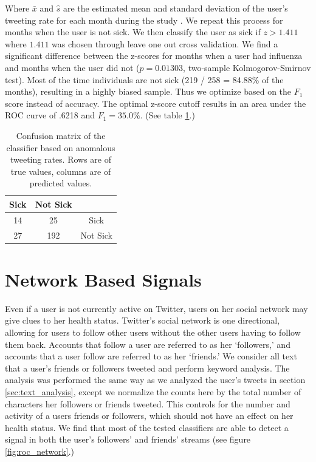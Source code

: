 \documentclass{acm_proc_article-sp}
\begin{document}
Where \(\bar{x}\) and \(\hat{s}\) are the estimated mean and standard deviation of the user's tweeting rate for each month during the study \cite{Grubs:1969ab}. We repeat this process for months when the user is not sick. We then classify the user as sick if \(z > 1.411\) where \(1.411\) was chosen through leave one out cross validation. We find a significant difference between the z-scores for months when a user had influenza and months when the user did not (\(p = 0.01303\), two-sample Kolmogorov-Smirnov test). Most of the time individuals are not sick (219 / 258 = 84.88\% of the months), resulting in a highly biased sample. Thus we optimize based on the \(F_1\) score instead of accuracy. The optimal z-score cutoff results in  an area under the ROC curve of .6218 and \(F_1= 35.0\%\). (See table \ref{tab:tweet_anomaly_confusion}.) 


\begin{table}[h]
\centering
\begin{tabular}{|c|c|c|} \hline
Sick&Not Sick&\ \\ \hline
14 & 25 & Sick\\ \hline
27 & 192 & Not Sick\\
\hline\end{tabular}
\caption{Confusion matrix of the classifier based on anomalous tweeting rates. Rows are of true values, columns are of predicted values.}
\label{tab:tweet_anomaly_confusion}
\end{table}

\section{Network Based Signals}

Even if a user is not currently active on Twitter, users on her social network may give clues to her health status. Twitter's social network is one directional, allowing for users to follow other users without the other users having to follow them back. Accounts that follow a user are referred to as her `followers,' and accounts that a user follow are referred to as her `friends.' We consider all text that a user's friends or followers tweeted and perform keyword analysis. The analysis was performed the same way as we analyzed the user's tweets in section \ref{sec:text_analysis}, except we normalize the counts here by the total number of characters her followers or friends tweeted. This controls for the number and activity of a users friends or followers, which should not have an effect on her health status. We find that most of the tested classifiers are able to detect a signal in both the user's followers' and friends' streams (see figure \ref{fig:roc_network}.)
\end{document}
